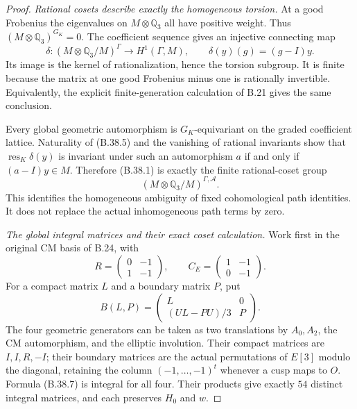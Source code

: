 \begin{proof}
\emph{Rational cosets describe exactly the homogeneous torsion.}
At a good Frobenius the eigenvalues on $M\otimes\mathbb Q_3$
all have positive weight. Thus
$(M\otimes\mathbb Q_3)^{G_K}=0$.
The coefficient sequence gives an injective connecting map
\[
 \delta:(M\otimes\mathbb Q_3/M)^{\Gamma}
                  \longrightarrow H^1(\Gamma,M),
 \qquad \delta(y)(g)=(g-I)y.                                 \tag{B.38.5}
\]
Its image is the kernel of rationalization, hence the
torsion subgroup. It is finite because the matrix at
one good Frobenius minus one is rationally invertible.
Equivalently, the explicit finite-generation calculation
of B.21 gives the same conclusion.

Every global geometric automorphism is $G_K$-equivariant
on the graded coefficient lattice. Naturality of (B.38.5)
and the vanishing of rational invariants show that
$\operatorname{res}_K\delta(y)$ is invariant under such
an automorphism $a$ if and only if $(a-I)y\in M$.
Therefore (B.38.1) is exactly the finite rational-coset
group
\[
                   (M\otimes\mathbb Q_3/M)^{\Gamma,\mathcal A}.
                                                               \tag{B.38.6}
\]
This identifies the homogeneous ambiguity of fixed
cohomological path identities. It does not replace
the actual inhomogeneous path terms by zero.

\emph{The global integral matrices and their exact coset calculation.}
Work first in the original CM basis of B.24, with
\[
 R=\begin{pmatrix}0&-1\\1&-1\end{pmatrix},\qquad
 C_E=\begin{pmatrix}1&-1\\0&-1\end{pmatrix}.
\]
For a compact matrix $L$ and a boundary matrix $P$, put
\[
                 B(L,P)=
       \begin{pmatrix}L&0\\(UL-PU)/3&P\end{pmatrix}.          \tag{B.38.7}
\]
The four geometric generators can be taken as two
translations by $A_0,A_2$, the CM automorphism, and
the elliptic involution. Their compact matrices are
$I,I,R,-I$; their boundary matrices are the actual
permutations of $E[3]$ modulo the diagonal, retaining
the column $(-1,\ldots,-1)^t$ whenever a cusp maps to $O$.
Formula (B.38.7) is integral for all four.
Their products give exactly $54$ distinct integral
matrices, and each preserves $H_0$ and $w$.


\end{proof}
